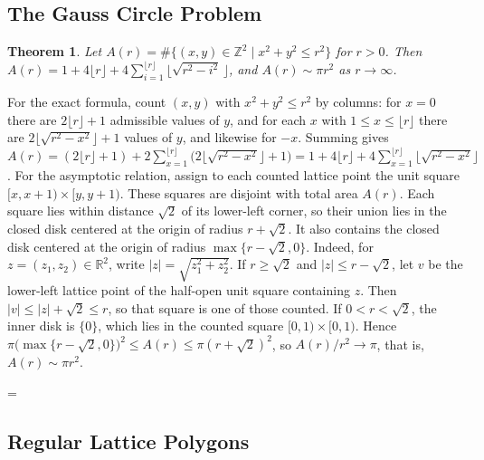 \documentclass[11pt]{article}
\makeatletter
\theoremstyle{ntstyle}
\newtheorem{theorem}{Theorem}[subsection]
\let\nt@closedisplay\]
\def\nt@guardedclose{\@ifnextchar\par{\nt@closeafterpar}{\@ifnextchar\end{\postdisplaypenalty\@M\nt@closedisplay}{\nt@closedisplay}}}
\def\nt@closeafterpar\par{\@ifnextchar\par{\nt@closeafterpar}{\@ifnextchar\end{\postdisplaypenalty\@M\nt@closedisplay\par}{\nt@closedisplay\par}}}
\renewenvironment{proof}[1][\proofname]{\par
  \pushQED{\qed}\normalfont\topsep\medskipamount\edef\nt@afterproof{\@endparpenalty=\the\@endparpenalty\relax}\@beginparpenalty\@M\@endparpenalty\@M\let\]\nt@guardedclose\trivlist\item[]\textit{#1\@addpunct{.}} \ignorespaces}{\ifvmode\addpenalty\@M\fi\popQED\nt@afterproof\endtrivlist\@endpefalse}
\makeatother
\begin{document}
\subsection{The Gauss Circle Problem}

\begin{theorem}\label{thm:10.9.1} Let $A(r) =
		\#\{(x,y)\in\mathbb{Z}^2 \mid x^2 + y^2 \le r^2\}$ for $r>0$. Then $A(r)
		= 1 + 4\lfloor r\rfloor + 4\sum_{i=1}^{\lfloor r\rfloor}\big\lfloor
		\sqrt{r^2 - i^2}\,\big\rfloor$, and $A(r) \sim \pi r^2$ as $r\to\infty$.

\end{theorem}

\begin{proof} For the exact formula, count $(x,y)$ with
	$x^2+y^2\le r^2$ by columns: for $x=0$ there are $2\lfloor
		r\rfloor+1$ admissible values of $y$, and for each $x$ with $1\le x\le\lfloor
		r\rfloor$ there are $2\big\lfloor\sqrt{r^2-x^2}\big\rfloor+1$ values
	of $y$, and likewise for $-x$. Summing gives $A(r)=(2\lfloor
		r\rfloor+1)+2\sum_{x=1}^{\lfloor
			r\rfloor}\big(2\lfloor\sqrt{r^2-x^2}\rfloor+1\big)=1+4\lfloor
		r\rfloor+4\sum_{x=1}^{\lfloor
			r\rfloor}\big\lfloor\sqrt{r^2-x^2}\big\rfloor$. For the asymptotic relation,
	assign to each counted lattice point the unit square
	$[x,x+1)\times[y,y+1)$. These squares are disjoint with total area
	$A(r)$. Each square lies within distance $\sqrt2$ of its lower-left
	corner, so their union lies in the closed disk centered at the origin
	of radius $r+\sqrt2$. It also contains the closed disk centered at
	the origin of radius $\max\{r-\sqrt2,0\}$.
	Indeed, for $z=(z_1,z_2)\in\mathbb{R}^2$, write
	$|z|=\sqrt{z_1^2+z_2^2}$. If $r\ge\sqrt2$ and $|z|\le r-\sqrt2$, let $v$
	be the lower-left lattice point of the half-open unit square containing
	$z$. Then $|v|\le|z|+\sqrt2\le r$, so that
	square is one of those counted. If $0<r<\sqrt2$, the inner disk is
	$\{0\}$, which lies in the counted square $[0,1)\times[0,1)$.
	Hence
	$\pi\big(\max\{r-\sqrt{2}, 0\}\big)^2\le A(r)\le\pi(r+\sqrt{2})^2$, so $A(r)/r^2\to\pi$,
	that is, $A(r)\sim\pi r^2$.

\end{proof}
\subsection{Regular Lattice Polygons}
\end{document}
